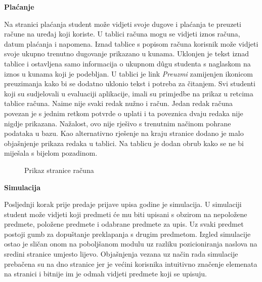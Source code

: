 \documentclass[times, utf8, zavrsni, numeric]{fer}
\begin{document}
    \noindent\textbf{Plaćanje}
    
    Na stranici plaćanja student može vidjeti svoje dugove i plaćanja te preuzeti račune na uređaj koji koriste. U tablici računa mogu se vidjeti iznos računa, datum plaćanja i napomena. Iznad tablice s popisom računa korisnik može vidjeti svoje ukupno trenutno dugovanje prikazano u kunama. Uklonjen je tekst iznad tablice i ostavljena samo informacija o ukupnom dûgu studenta s naglaskom na iznos u kunama koji je podebljan. U tablici je link \textit{Preuzmi} zamijenjen ikonicom preuzimanja kako bi se dodatno uklonio tekst i potreba za čitanjem. Svi studenti koji su sudjelovali u evaluaciji aplikacije, imali su primjedbe na prikaz u retcima tablice računa. Naime nije svaki redak nužno i račun. Jedan redak računa povezan je s jednim retkom potvrde o uplati i ta poveznica dvaju redaka nije nigdje prikazana. Nažalost, ovo nije rješivo s trenutnim načinom pohrane podataka u bazu. Kao alternativno rješenje na kraju stranice dodano je malo objašnjenje prikaza redaka u tablici. Na tablicu je dodan obrub kako se ne bi miješala s bijelom pozadinom.
    
    \begin{figure} [H]
      \centering
      \caption{Prikaz stranice računa}
    \end{figure}
    
    \noindent\textbf{Simulacija}
    
    Posljednji korak prije predaje prijave upisa godine je simulacija. U simulaciji student može vidjeti koji predmeti će mu biti upisani s obzirom na nepoložene predmete, položene predmete i odabrane predmete za upis. Uz svaki predmet postoji gumb za dopuštanje preklapanja s drugim predmetom. Izgled simulacije ostao je sličan onom na poboljšanom modulu uz razliku pozicioniranja naslova na sredini stranice umjesto lijevo. Objašnjenja vezana uz način rada simulacije prebačena su na dno stranice jer je većini korisnika intuitivno značenje elemenata na stranici i bitnije im je odmah vidjeti predmete koji se upisuju.
    
\end{document}
